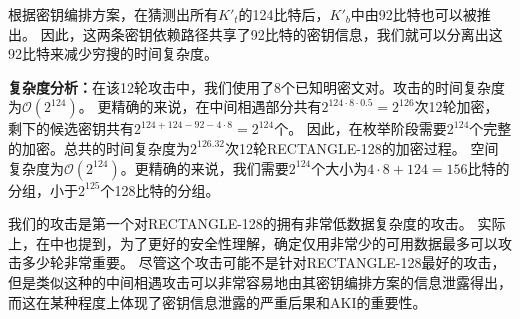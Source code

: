 根据密钥编排方案，在猜测出所有$K'_t$的124比特后，$K'_b$中由92比特也可以被推出。
因此，这两条密钥依赖路径共享了92比特的密钥信息，我们就可以分离出这92比特来减少穷搜的时间复杂度。

\noindent
\textbf{复杂度分析：}在该12轮攻击中，我们使用了8个已知明密文对。攻击的时间复杂度为$\mathcal{O}(2^{124})$。
更精确的来说，在中间相遇部分共有$2^{124\cdot 8\cdot 0.5}=2^{126}$次12轮加密，剩下的候选密钥共有$2^{124+124-92-4\cdot 8}=2^{124}$个。
因此，在枚举阶段需要$2^{124}$个完整的加密。总共的时间复杂度为$2^{126.32}$次12轮RECTANGLE-128的加密过程。
空间复杂度为$\mathcal{O}(2^{124})$。更精确的来说，我们需要$2^{124}$个大小为$4\cdot 8+124=156$比特的分组，小于$2^{125}$个128比特的分组。

我们的攻击是第一个对RECTANGLE-128的拥有非常低数据复杂度的攻击。
实际上，在中也提到，为了更好的安全性理解，确定仅用非常少的可用数据最多可以攻击多少轮非常重要。
尽管这个攻击可能不是针对RECTANGLE-128最好的攻击，但是类似这种的中间相遇攻击可以非常容易地由其密钥编排方案的信息泄露得出，而这在某种程度上体现了密钥信息泄露的严重后果和AKI的重要性。
